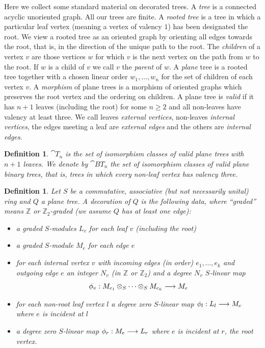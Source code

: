 \documentclass[english,letter paper,12pt,leqno]{article}
\theoremstyle{example}
\newtheorem{definition}[theorem]{Definition}
\numberwithin{equation}{section}
\def\nZ{\mathds{Z}}
\begin{document}
Here we collect some standard material on decorated trees. A \emph{tree} is a connected acyclic unoriented graph. All our trees are finite. A \emph{rooted tree} is a tree in which a particular leaf vertex (meaning a vertex of valency $1$) has been designated the root. We view a rooted tree as an oriented graph by orienting all edges towards the root, that is, in the direction of the unique path to the root. The \emph{children} of a vertex $v$ are those vertices $w$ for which $v$ is the next vertex on the path from $w$ to the root. If $w$ is a child of $v$ we call $v$ the \emph{parent} of $w$. A \emph{plane} tree is a rooted tree together with a chosen linear order $w_1,\ldots,w_n$ for the set of children of each vertex $v$. A \emph{morphism} of plane trees is a morphism of oriented graphs which preserves the root vertex and the ordering on children. A plane tree is \emph{valid} if it has $n + 1$ leaves (including the root) for some $n \ge 2$ and all non-leaves have valency at least three. We call leaves \emph{external vertices}, non-leaves \emph{internal vertices}, the edges meeting a leaf are \emph{external edges} and the others are \emph{internal edges}.

\begin{definition} $\cat{T}_n$ is the set of isomorphism classes of valid plane trees with $n + 1$ leaves. We denote by $\cat{BT}_n$ the set of isomorphism classes of valid plane \emph{binary} trees, that is, trees in which every non-leaf vertex has valency three.
\end{definition}

\begin{definition} Let $S$ be a commutative, associative (but not necessarily unital) ring and $Q$ a plane tree. A \emph{decoration} of $Q$ is the following data, where ``graded'' means $\nZ$ or $\nZ_2$-graded (we assume $Q$ has at least one edge):
\begin{itemize}
\item a graded $S$-modules $L_v$ for each leaf $v$ (including the root)
\item a graded $S$-module $M_e$ for each edge $e$
\item for each internal vertex $v$ with incoming edges (in order) $e_1,\ldots,e_k$ and outgoing edge $e$ an integer $N_v$ (in $\nZ$ or $\nZ_2$) and a degree $N_v$ $S$-linear map
\[
\phi_v: M_{e_1} \otimes_S \cdots \otimes_S M_{e_k} \longrightarrow M_e
\]
\item for each non-root leaf vertex $l$ a degree zero $S$-linear map $\phi_l: L_l \longrightarrow M_e$ where $e$ is incident at $l$
\item a degree zero $S$-linear map $\phi_r: M_e \longrightarrow L_r$ where $e$ is incident at $r$, the root vertex.
\end{itemize}
\end{definition}
\end{document}
